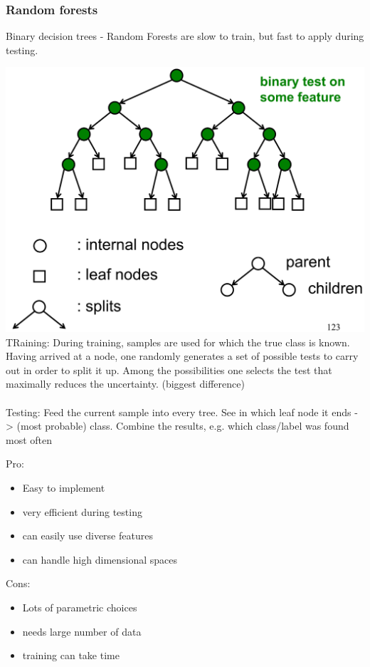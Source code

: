 \subsubsection{Random forests}
Binary decision trees - Random Forests are slow to train, but fast to apply during testing.

\includegraphics[width=\columnwidth]{pictures/tree}
TRaining: During training, samples are used for which the true class is known.
Having arrived at a node, one randomly generates a set of possible tests to carry out in order to split it up.
Among the possibilities one selects the test that maximally reduces the uncertainty. (biggest difference)\\
\\
Testing: Feed the current sample into every tree. See in which leaf node it ends -> (most probable) class. Combine the results, e.g. which class/label was found most often

Pro:
\begin{itemize}
	\item Easy to implement
	\item very efficient during testing
	\item can easily use diverse features
	\item can handle high dimensional spaces
\end{itemize}
Cons:
\begin{itemize}
	\item Lots of parametric choices
	\item needs large number of data
	\item training can take time
\end{itemize}